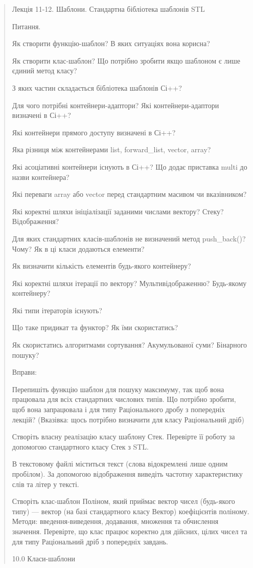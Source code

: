 \documentclass[]{article}
\begin{document}
\begin{quote}
Лекція 11-12. Шаблони. Стандартна бібліотека шаблонів STL

\protect\hypertarget{_Hlk57989145}{}{}Питання.

Як створити функцію-шаблон? В яких ситуаціях вона корисна?

Як створити клас-шаблон? Що потрібно зробити якщо шаблоном є лише єдиний
метод класу?

З яких частин складається бібліотека шаблонів Сі++?

Для чого потрібні контейнери-адаптори? Які контейнери-адаптори визначені
в Сі++?

Які контейнери прямого доступу визначені в Сі++?

Яка різниця між контейнерами list, forward\_list, vector, array?

Які асоціативні контейнери існують в Сі++? Що додає приставка multi до
назви контейнера?

Які переваги array або vector перед стандартним масивом чи вказівником?

Які коректні шляхи ініціалізації заданими числами вектору? Стеку?
Відображення?

Для яких стандартних класів-шаблонів не визначений метод push\_back()?
Чому? Як в ці класи додаються елементи?

Як визначити кількість елементів будь-якого контейнеру?

Які коректні шляхи ітерації по вектору? Мультивідображенню? Будь-якому
контейнеру?

Які типи ітераторів існують?

Що таке придикат та функтор? Як їми скористатись?

Як скористатись алгоритмами сортування? Акумульованої суми? Бінарного
пошуку?

Вправи:

\protect\hypertarget{_Hlk65951809}{}{\protect\hypertarget{_Hlk65951788}{}{}}Перепишіть
функцію шаблон для пошуку максимуму, так щоб вона працювала для всіх
стандартних числових типів. Що потрібно зробити, щоб вона запрацювала і
для типу Раціонального дробу з попередніх лекцій? (Вказівка: щось
потрібно визначити для класу Раціональний дріб)

Створіть власну реалізацію класу шаблону Стек. Перевірте її роботу за
допомогою стандартного класу Стек з STL.

В текстовому файлі міститься текст (слова відокремлені лише одним
пробілом). За допомогою відображення виведіть частотну характеристику
слів та літер у тексті.

Створіть клас-шаблон Поліном, який приймає вектор чисел (будь-якого
типу) --- вектор (на базі стандартного класу Вектор) коефіцієнтів
поліному. Методи: введення-виведення, додавання, множення та обчислення
значення. Перевірте, що клас працює коректно для дійсних, цілих чисел та
для типу Раціональний дріб з попередніх завдань.

10.0 Класи-шаблони
\end{quote}
\end{document}
